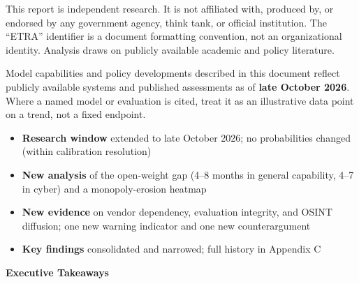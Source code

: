 \documentclass[11pt,letterpaper]{article}
\makeatletter
\newcommand{\etraneed}[1]{\par\if@nobreak\else\penalty\z@\ifdim\pagegoal<\maxdimen\ifdim\dimexpr\pagegoal-\pagetotal\relax<\dimexpr#1\relax\newpage\fi\fi\fi}
\makeatother
\begin{document}
\begin{infobox}
This report is independent research. It is not affiliated with, produced by, or endorsed by any government agency, think tank, or official institution. The ``ETRA'' identifier is a document formatting convention, not an organizational identity. Analysis draws on publicly available academic and policy literature.
\end{infobox}

\begin{infobox}
Model capabilities and policy developments described in this document reflect publicly available systems and published assessments as of \textbf{late October 2026}. Where a named model or evaluation is cited, treat it as an illustrative data point on a trend, not a fixed endpoint.
\end{infobox}

\begin{infobox}
\begin{itemize}[nosep]
  \item \textbf{Research window} extended to late October 2026; no probabilities changed (within calibration resolution)
  \item \textbf{New analysis} of the open-weight gap (4--8 months in general capability, 4--7 in cyber) and a monopoly-erosion heatmap
  \item \textbf{New evidence} on vendor dependency, evaluation integrity, and OSINT diffusion; one new warning indicator and one new counterargument
  \item \textbf{Key findings} consolidated and narrowed; full history in Appendix C
\end{itemize}
\end{infobox}

\etraneed{10\baselineskip}
\vspace{0.4cm}
\begin{center}
{\color{slatedark}\Large\bfseries Executive Takeaways}
\end{center}
\end{document}
